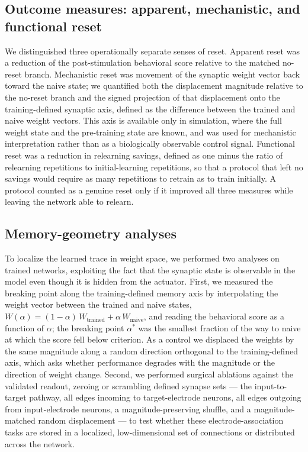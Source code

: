 \documentclass{article}
\begin{document}
\subsection{Outcome measures: apparent, mechanistic, and functional reset}

We distinguished three operationally separate senses of reset. Apparent reset was a reduction of the post-stimulation behavioral score relative to the matched no-reset branch. Mechanistic reset was movement of the synaptic weight vector back toward the naive state; we quantified both the displacement magnitude relative to the no-reset branch and the signed projection of that displacement onto the training-defined synaptic axis, defined as the difference between the trained and naive weight vectors. This axis is available only in simulation, where the full weight state and the pre-training state are known, and was used for mechanistic interpretation rather than as a biologically observable control signal. Functional reset was a reduction in relearning savings, defined as one minus the ratio of relearning repetitions to initial-learning repetitions, so that a protocol that left no savings would require as many repetitions to retrain as to train initially. A protocol counted as a genuine reset only if it improved all three measures while leaving the network able to relearn.

\subsection{Memory-geometry analyses}

To localize the learned trace in weight space, we performed two analyses on trained networks, exploiting the fact that the synaptic state is observable in the model even though it is hidden from the actuator. First, we measured the breaking point along the training-defined memory axis by interpolating the weight vector between the trained and naive states, $W(\alpha) = (1 - \alpha)\,W_{\mathrm{trained}} + \alpha\,W_{\mathrm{naive}}$, and reading the behavioral score as a function of $\alpha$; the breaking point $\alpha^{*}$ was the smallest fraction of the way to naive at which the score fell below criterion. As a control we displaced the weights by the same magnitude along a random direction orthogonal to the training-defined axis, which asks whether performance degrades with the magnitude or the direction of weight change. Second, we performed surgical ablations against the validated readout, zeroing or scrambling defined synapse sets --- the input-to-target pathway, all edges incoming to target-electrode neurons, all edges outgoing from input-electrode neurons, a magnitude-preserving shuffle, and a magnitude-matched random displacement --- to test whether these electrode-association tasks are stored in a localized, low-dimensional set of connections or distributed across the network.
\end{document}
